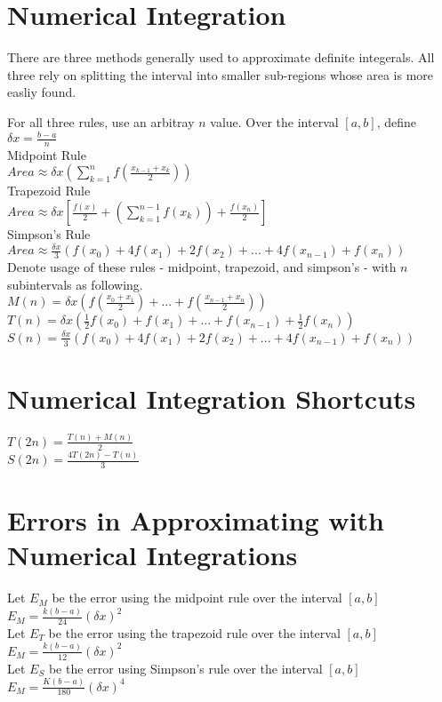 \documentclass{article}
\begin{document}
\section{Numerical Integration}
There are three methods generally used to approximate definite integerals. All three rely on splitting the interval into smaller sub-regions whose area is more easliy found.

For all three rules, use an arbitray $n$ value. Over the interval $[a, b]$, define $\delta x = \frac{b - a}{n}$\\
Midpoint Rule\\
$Area \approx \delta x (\sum_{k=1}^{n} f(\frac{x_{k-1} + x_k}{2}))$\\
Trapezoid Rule\\
$Area \approx \delta x [\frac{f(x)}{2} + (\sum_{k=1}^{n-1} f(x_k)) + \frac{f(x_n)}{2}]$\\
Simpson's Rule\\
$Area \approx \frac{\delta x}{3}(f(x_0) + 4f(x_1) + 2f(x_2) + ... + 4f(x_{n-1}) + f(x_n))$\\

Denote usage of these rules - midpoint, trapezoid, and simpson's - with $n$ subintervals as following.\\
$M(n) = \delta x(f(\frac{x_0 + x_1}{2}) + ... + f(\frac{x_{n-1} + x_n}{2}))$\\
$T(n) = \delta x(\frac{1}{2} f(x_0) + f(x_1) + ... + f(x_{n-1}) + \frac{1}{2} f(x_n))$\\
$S(n) = \frac{\delta x}{3}(f(x_0) + 4f(x_1) + 2f(x_2) + ... + 4f(x_{n-1}) + f(x_n))$\\

\section{Numerical Integration Shortcuts}
$T(2n) = \frac{T(n) + M(n)}{2}$\\
$S(2n) = \frac{4T(2n) - T(n)}{3}$\\

\section{Errors in Approximating with Numerical Integrations}
Let $E_M$ be the error using the midpoint rule over the interval $[a, b]$\\
$E_M = \frac{k(b-a)}{24}(\delta x)^2$\\
Let $E_T$ be the error using the trapezoid rule over the interval $[a, b]$\\
$E_M = \frac{k(b-a)}{12}(\delta x)^2$\\
Let $E_S$ be the error using Simpson's rule over the interval $[a, b]$\\
$E_M = \frac{K(b-a)}{180}(\delta x)^4$\\
\end{document}

